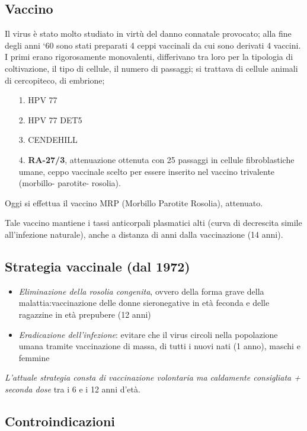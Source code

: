 \subsection{Vaccino}

Il virus è stato molto studiato in virtù del danno connatale provocato;
alla fine degli anni `60 sono stati preparati 4 ceppi vaccinali da cui
sono derivati 4 vaccini. I primi erano rigorosamente monovalenti,
differivano tra loro per la tipologia di coltivazione, il tipo di
cellule, il numero di passaggi; si trattava di cellule animali di
cercopiteco, di embrione;

\begin{itemize}
\item[1.]
  HPV 77
\item[2.]
  HPV 77 DET5
\item[3.]
  CENDEHILL
\item[4.]
  \textbf{RA-27/3}, attenuazione ottenuta con 25 passaggi in cellule
  fibroblastiche umane, ceppo vaccinale scelto per essere inserito nel
  vaccino trivalente (morbillo- parotite- rosolia).
\end{itemize}

Oggi si effettua il vaccino MRP (Morbillo Parotite Rosolia), attenuato.

Tale vaccino mantiene i tassi anticorpali plasmatici alti (curva di
decrescita simile all'infezione naturale), anche a distanza di anni
dalla vaccinazione (14 anni).

\subsection{Strategia vaccinale (dal 1972)}

\begin{itemize}
\item
  \emph{Eliminazione della rosolia
  congenita}, ovvero della forma grave
  della malattia:vaccinazione delle donne sieronegative in età feconda e
  delle ragazzine in età prepubere (12 anni)
\item
  \emph{Eradicazione dell'infezione}: evitare che il virus circoli nella
  popolazione umana tramite vaccinazione di massa, di tutti i nuovi nati
  (1 anno), maschi e femmine
\end{itemize}

\emph{L'attuale strategia consta di vaccinazione volontaria ma
caldamente consigliata + seconda dose} tra i 6 e i 12 anni d'età.

\subsection{Controindicazioni}

